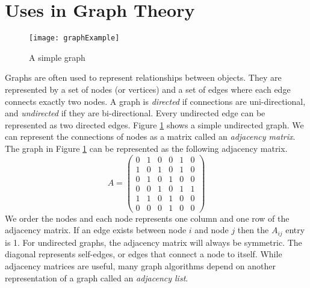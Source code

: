 \section*{Uses in Graph Theory}
\begin{figure}[h]
\texttt{[image: graphExample]}
\caption{A simple graph}
\label{fig:example_graph}
\end{figure}

Graphs are often used to represent relationships between objects.
They are represented by a set of nodes (or vertices) and a set of edges where each edge connects exactly two nodes.
A graph is \emph{directed} if connections are uni-directional, and \emph{undirected} if they are bi-directional.
Every undirected edge can be represented as two directed edges.
Figure \ref{fig:example_graph} shows a simple undirected graph.
We can represent the connections of nodes as a matrix called an \emph{adjacency matrix}.
The graph in Figure \ref{fig:example_graph} can be represented as the following adjacency matrix.
\[
A = \begin{pmatrix}
0 & 1 & 0 & 0 & 1 & 0\\
1 & 0 & 1 & 0 & 1 & 0\\
0 & 1 & 0 & 1 & 0 & 0\\
0 & 0 & 1 & 0 & 1 & 1\\
1 & 1 & 0 & 1 & 0 & 0\\
0 & 0 & 0 & 1 & 0 & 0
\end{pmatrix}
\]
We order the nodes and each node represents one column and one row of the adjacency matrix.
If an edge exists between node $i$ and node $j$ then the $A_{ij}$ entry is 1.
For undirected graphs, the adjacency matrix will always be symmetric.
The diagonal represents self-edges, or edges that connect a node to itself.
While adjacency matrices are useful, many graph algorithms depend on another representation of a graph called an \emph{adjacency list}.

